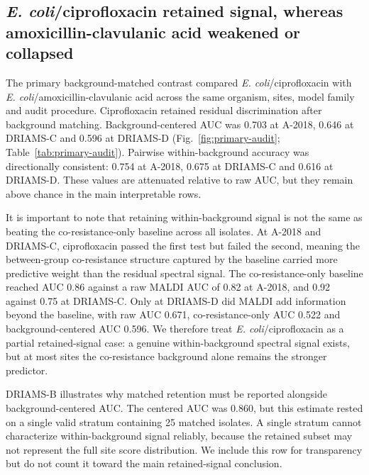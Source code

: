 \documentclass[11pt]{article}
\begin{document}
\subsection*{\textit{E. coli}/ciprofloxacin retained signal, whereas amoxicillin-clavulanic acid weakened or collapsed}

The primary background-matched contrast compared \textit{E. coli}/ciprofloxacin with \textit{E. coli}/amoxicillin-clavulanic acid across the same organism, sites, model family and audit procedure. Ciprofloxacin retained residual discrimination after background matching. Background-centered AUC was 0.703 at A-2018, 0.646 at DRIAMS-C and 0.596 at DRIAMS-D (Fig.~\ref{fig:primary-audit}; Table~\ref{tab:primary-audit}). Pairwise within-background accuracy was directionally consistent: 0.754 at A-2018, 0.675 at DRIAMS-C and 0.616 at DRIAMS-D. These values are attenuated relative to raw AUC, but they remain above chance in the main interpretable rows.

It is important to note that retaining within-background signal is not the same as beating the co-resistance-only baseline across all isolates. At A-2018 and DRIAMS-C, ciprofloxacin passed the first test but failed the second, meaning the between-group co-resistance structure captured by the baseline carried more predictive weight than the residual spectral signal. The co-resistance-only baseline reached AUC 0.86 against a raw MALDI AUC of 0.82 at A-2018, and 0.92 against 0.75 at DRIAMS-C. Only at DRIAMS-D did MALDI add information beyond the baseline, with raw AUC 0.671, co-resistance-only AUC 0.522 and background-centered AUC 0.596. We therefore treat \textit{E. coli}/ciprofloxacin as a partial retained-signal case: a genuine within-background spectral signal exists, but at most sites the co-resistance background alone remains the stronger predictor.

DRIAMS-B illustrates why matched retention must be reported alongside background-centered AUC. The centered AUC was 0.860, but this estimate rested on a single valid stratum containing 25 matched isolates. A single stratum cannot characterize within-background signal reliably, because the retained subset may not represent the full site score distribution. We include this row for transparency but do not count it toward the main retained-signal conclusion.
\end{document}
